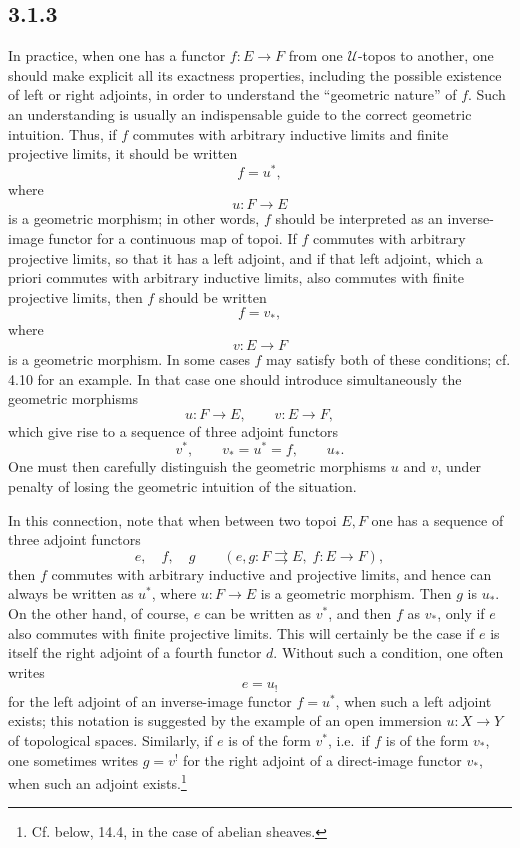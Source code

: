 \documentclass[11pt]{article}
\newcommand{\U}{\mathcal{U}}
\newcommand{\ie}{i.e.}
\begin{document}
\subsection*{3.1.3}
In practice, when one has a functor \(f:E\to F\) from one \(\U\)-topos to another, one should make explicit all its exactness properties, including the possible existence of left or right adjoints, in order to understand the ``geometric nature'' of \(f\). Such an understanding is usually an indispensable guide to the correct geometric intuition. Thus, if \(f\) commutes with arbitrary inductive limits and finite projective limits, it should be written
\[
f=u^\ast,
\]
where
\[
u:F\longrightarrow E
\]
is a geometric morphism; in other words, \(f\) should be interpreted as an inverse-image functor for a continuous map of topoi. If \(f\) commutes with arbitrary projective limits, so that it has a left adjoint, and if that left adjoint, which a priori commutes with arbitrary inductive limits, also commutes with finite projective limits, then \(f\) should be written
\[
f=v_\ast,
\]
where
\[
v:E\longrightarrow F
\]
is a geometric morphism. In some cases \(f\) may satisfy both of these conditions; cf. 4.10 for an example. In that case one should introduce simultaneously the geometric morphisms
\[
u:F\longrightarrow E,
\qquad
v:E\longrightarrow F,
\]
which give rise to a sequence of three adjoint functors
\[
v^\ast,
\qquad v_\ast=u^\ast=f,
\qquad u_\ast.
\]
One must then carefully distinguish the geometric morphisms \(u\) and \(v\), under penalty of losing the geometric intuition of the situation.

In this connection, note that when between two topoi \(E,F\) one has a sequence of three adjoint functors
\[
e,
\quad f,
\quad g
\qquad(e,g:F\rightrightarrows E,\; f:E\to F),
\]
then \(f\) commutes with arbitrary inductive and projective limits, and hence can always be written as \(u^\ast\), where \(u:F\to E\) is a geometric morphism. Then \(g\) is \(u_\ast\). On the other hand, of course, \(e\) can be written as \(v^\ast\), and then \(f\) as \(v_\ast\), only if \(e\) also commutes with finite projective limits. This will certainly be the case if \(e\) is itself the right adjoint of a fourth functor \(d\). Without such a condition, one often writes
\[
e=u_!
\]
for the left adjoint of an inverse-image functor \(f=u^\ast\), when such a left adjoint exists; this notation is suggested by the example of an open immersion \(u:X\to Y\) of topological spaces. Similarly, if \(e\) is of the form \(v^\ast\), \ie\ if \(f\) is of the form \(v_\ast\), one sometimes writes \(g=v^!\) for the right adjoint of a direct-image functor \(v_\ast\), when such an adjoint exists.\footnote{Cf. below, 14.4, in the case of abelian sheaves.}
\end{document}
